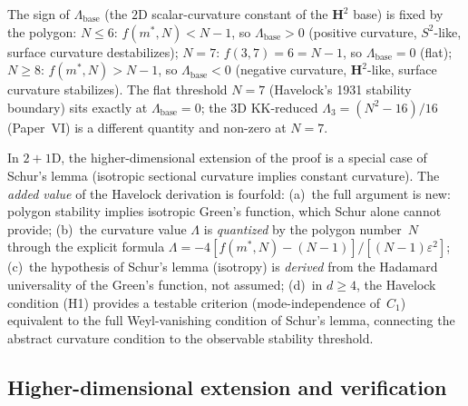 \begin{corollary}
\label{cor:lambda-from-N}
The sign of $\Lambda_{\mathrm{base}}$ (the $2$D scalar-curvature
constant of the $\mathbf{H}^2$ base) is fixed by the polygon:
$N \le 6$: $f(m^*,N) < N{-}1$, so $\Lambda_{\mathrm{base}} > 0$
(positive curvature, $S^2$-like, surface curvature destabilizes);
$N = 7$: $f(3,7) = 6 = N{-}1$, so $\Lambda_{\mathrm{base}} = 0$
(flat);
$N \ge 8$: $f(m^*,N) > N{-}1$, so $\Lambda_{\mathrm{base}} < 0$
(negative curvature, $\mathbf{H}^2$-like, surface curvature stabilizes).
The flat threshold $N = 7$ (Havelock's 1931 stability boundary)
sits exactly at $\Lambda_{\mathrm{base}} = 0$; the $3$D KK-reduced
$\Lambda_3 = (N^2{-}16)/16$ (Paper~VI) is a different quantity
and non-zero at $N = 7$.
\end{corollary}

\begin{remark}
In $2{+}1$D, the higher-dimensional extension of the proof is a special case
of Schur's lemma (isotropic sectional curvature implies
constant curvature).
The \emph{added value} of the Havelock derivation is fourfold:
(a)~the full argument is new: polygon stability implies isotropic
Green's function, which Schur alone cannot provide;
(b)~the curvature value $\Lambda$ is \emph{quantized}
by the polygon number~$N$ through the explicit formula
$\Lambda = -4[f(m^*,N) - (N{-}1)]/[(N{-}1)\varepsilon^2]$;
(c)~the hypothesis of Schur's lemma (isotropy) is
\emph{derived} from the Hadamard universality of the
Green's function, not assumed;
(d)~in $d \ge 4$, the Havelock condition (H1) provides a
testable criterion (mode-independence of~$C_1$) equivalent
to the full Weyl-vanishing condition of Schur's lemma,
connecting the abstract curvature condition to
the observable stability threshold.
\end{remark}

\subsection{Higher-dimensional extension and verification}

